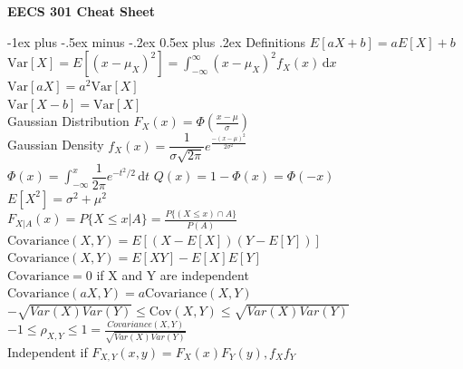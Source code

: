 \documentclass[11pt,landscape]{article}
\makeatletter
\renewcommand{\section}{\@startsection{section}{1}{0mm}%
                                {-1ex plus -.5ex minus -.2ex}%
                                {0.5ex plus .2ex}%
                                {\normalfont\large\bfseries}}
\makeatother
\begin{document}
\raggedright
\footnotesize
\begin{multicols}{3}


\setlength{\premulticols}{1pt}
\setlength{\postmulticols}{1pt}
\setlength{\multicolsep}{1pt}
\setlength{\columnsep}{2pt}

\begin{center}
     \Large{\textbf{EECS 301 Cheat Sheet}} \\
\end{center}

\section{Definitions}
$E[aX + b] = aE[X] + b$ \\
$\mathrm{Var}[X] = E[(x-\mu_X)^2] = \int_{-\infty}^{\infty} \! (x-\mu_X)^2f_X(x) \, \mathrm{d}x$ \\
$\mathrm{Var}[aX] = a^2\mathrm{Var}[X]$ \\
$\mathrm{Var}[X-b] = \mathrm{Var}[X]$ \\
Gaussian Distribution $F_X(x) = \Phi(\frac{x-\mu}{\sigma})$ \\
Gaussian Density $f_X(x) = \dfrac{1}{\sigma\sqrt{2\pi}}e^{\frac{-(x-\mu)^2}{2\sigma^2}}$ \\
$\Phi(x) = \int_{-\infty}^x \! \dfrac{1}{2\pi}e^{-t^2/2} \, \mathrm{d}t$
\hspace{10pt} $Q(x) = 1-\Phi(x) = \Phi(-x)$ \\
$E[X^2] = \sigma^2 + \mu^2$ \\
$F_{X|A}(x) = P\{X\leq x|A\} = \frac{P\{(X\leq x) \cap A\}}{P(A)}$
$\mathrm{Covariance}(X, Y) = E[(X-E[X])(Y - E[Y])]$ \\
$\mathrm{Covariance}(X, Y) = E[XY] - E[X]E[Y]$ \\
$\mathrm{Covariance} = 0$ if X and Y are independent \\
$\mathrm{Covariance}(aX, Y) = a\mathrm{Covariance}(X, Y)$ \\
$-\sqrt{Var(X)Var(Y)} \leq \mathrm{Cov}(X, Y) \leq \sqrt{Var(X)Var(Y)}$ \\
$-1 \leq \rho_{X, Y} \leq 1 = \frac{Covariance(X, Y)}{\sqrt{Var(X)Var(Y)}}$ \\
Independent if $F_{X, Y}(x, y) = F_X(x)F_Y(y), f_Xf_Y$


\end{multicols}
\end{document}
